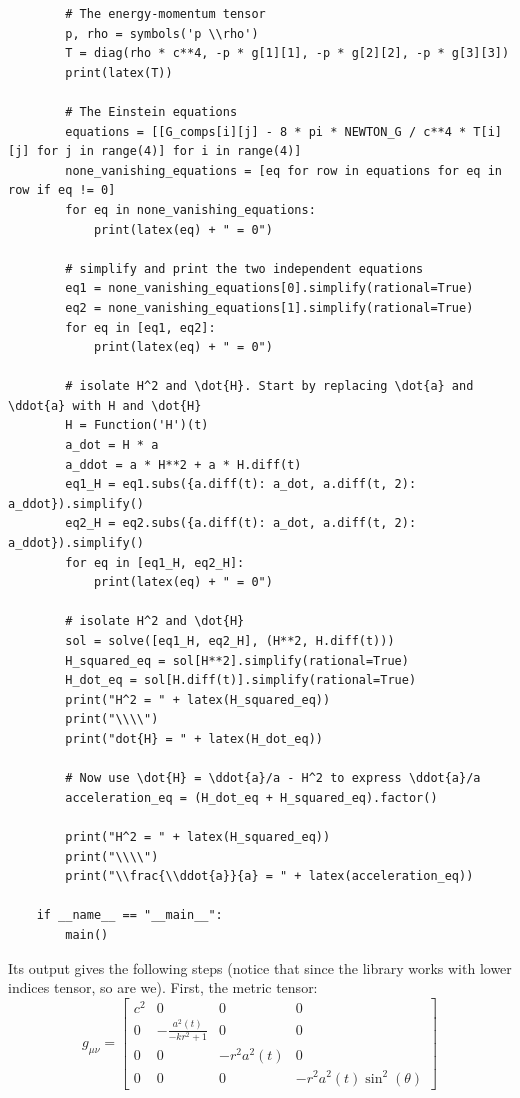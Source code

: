 \documentclass{article}
\begin{document}
\begin{verbatim}
        # The energy-momentum tensor
        p, rho = symbols('p \\rho')
        T = diag(rho * c**4, -p * g[1][1], -p * g[2][2], -p * g[3][3])
        print(latex(T))

        # The Einstein equations
        equations = [[G_comps[i][j] - 8 * pi * NEWTON_G / c**4 * T[i][j] for j in range(4)] for i in range(4)]
        none_vanishing_equations = [eq for row in equations for eq in row if eq != 0]
        for eq in none_vanishing_equations:
            print(latex(eq) + " = 0")

        # simplify and print the two independent equations
        eq1 = none_vanishing_equations[0].simplify(rational=True)
        eq2 = none_vanishing_equations[1].simplify(rational=True)
        for eq in [eq1, eq2]:
            print(latex(eq) + " = 0")

        # isolate H^2 and \dot{H}. Start by replacing \dot{a} and \ddot{a} with H and \dot{H}
        H = Function('H')(t)
        a_dot = H * a
        a_ddot = a * H**2 + a * H.diff(t)
        eq1_H = eq1.subs({a.diff(t): a_dot, a.diff(t, 2): a_ddot}).simplify()
        eq2_H = eq2.subs({a.diff(t): a_dot, a.diff(t, 2): a_ddot}).simplify()
        for eq in [eq1_H, eq2_H]:
            print(latex(eq) + " = 0")

        # isolate H^2 and \dot{H}
        sol = solve([eq1_H, eq2_H], (H**2, H.diff(t)))
        H_squared_eq = sol[H**2].simplify(rational=True)
        H_dot_eq = sol[H.diff(t)].simplify(rational=True)
        print("H^2 = " + latex(H_squared_eq))
        print("\\\\")
        print("dot{H} = " + latex(H_dot_eq))

        # Now use \dot{H} = \ddot{a}/a - H^2 to express \ddot{a}/a
        acceleration_eq = (H_dot_eq + H_squared_eq).factor()

        print("H^2 = " + latex(H_squared_eq))
        print("\\\\")
        print("\\frac{\\ddot{a}}{a} = " + latex(acceleration_eq))

    if __name__ == "__main__":
        main()
\end{verbatim}
Its output gives the following steps (notice that since the library works with lower indices tensor, so are we). First, the metric tensor:
\begin{equation}
    g_{\mu \nu} = \left[\begin{matrix}c^{2} & 0 & 0 & 0\\0 & - \frac{a^{2}{\left(t \right)}}{- k r^{2} + 1} & 0 & 0\\0 & 0 & - r^{2} a^{2}{\left(t \right)} & 0\\0 & 0 & 0 & - r^{2} a^{2}{\left(t \right)} \sin^{2}{\left(\theta \right)}\end{matrix}\right]
\end{equation}
\end{document}
